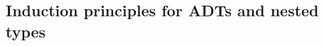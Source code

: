 \documentclass[9pt]{entcs}
\begin{document}
\begin{comment}
Nested types include simple nested types, like perfect trees,
none of whose recursive occurrences occur below another type constructor,
and \emph{truly} nested types, such as the nested type
\begin{equation}\label{eq:bush}
\begin{array}{l}
\mathsf{data\ Bush : Set \to Set\ where}\\
\mathsf{\;\;\;\;\;\;bNil\,\,\,\,\,\, :\, Bush\,A}\\
\mathsf{\;\;\;\;\;\;bCons\, :\, A \to Bush\,(Bush\,A) \to Bush\,A} 
\end{array}
\end{equation}
of bushes, whose recursive occurrences appear below their own type constructors.
Note that, while the constructors of a nested type can contain occurrences of the type instantiated at any index,
the return types of its constructors still have to be the same type instance of the type being defined.
In other words, all constructors of $\mathsf{PTree\,A}$ have to return an element of type $\mathsf{PTree\,A}$,
and all constructors of $\mathsf{Bush\,A}$ have to return an element of type $\mathsf{Bush\,A}$.
\end{comment}

\subsection{Induction principles for ADTs and nested
  types}\label{ssec:induction-nested} 
\end{document}
